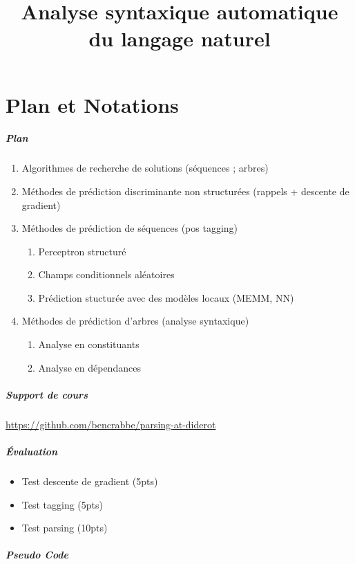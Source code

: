 \documentclass[11pt,openany]{book}
\title{Analyse syntaxique automatique du langage naturel}
\begin{document}
\chapter*{Plan et Notations}

\paragraph{Plan}
\begin{enumerate}
\item Algorithmes de recherche de solutions (séquences ; arbres)
\item Méthodes de prédiction discriminante non structurées (rappels + descente de gradient)
\item Méthodes de prédiction de séquences (pos tagging)
\begin{enumerate}
\item Perceptron structuré
\item Champs conditionnels aléatoires
\item Prédiction stucturée avec des modèles locaux (MEMM, NN)
\end{enumerate}
\item Méthodes de prédiction d'arbres (analyse syntaxique)
\begin{enumerate}
\item Analyse en constituants
\item Analyse en dépendances
\end{enumerate}
\end{enumerate}

\paragraph{Support de cours}
\url{https://github.com/bencrabbe/parsing-at-diderot}


\paragraph{\'Evaluation}
\begin{itemize}
\item Test descente de gradient (5pts)
\item Test tagging (5pts)
\item Test parsing (10pts)
\end{itemize}




\paragraph{Pseudo Code}
\end{document}
